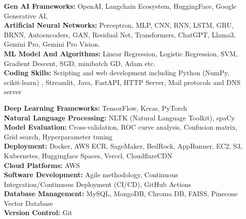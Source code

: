 \documentclass[letterpaper,11pt]{article}
\begin{document}
\begin{itemize}[leftmargin=0.15in, label={}]
    \small{
    \item{
        
        \textbf{Gen AI Frameworks:} OpenAI, Langchain Ecosystem, HuggingFace, Google Generative AI, \\
        \vspace{0.15cm}
        \textbf{Artificial Neural Networks:} Perceptron, MLP, CNN, RNN, LSTM, GRU, BRNN, Autoencoders, GAN, Residual Net, Transformers, ChatGPT, Llama3, Gemini Pro, Gemini Pro Vision.  \\
        \vspace{0.15cm}
        \textbf{ML Model And Algorithms:} Linear Regression, Logistic Regression, SVM, Gradient Descent, SGD, minibatch GD, Adam etc. \\
        \vspace{0.15cm}
        \textbf{Coding Skills:} Scripting and web development including Python (NumPy, scikit-learn) , Streamlit, Java, FastAPI, HTTP Server, Mail protocols and DNS server \\
        \vspace{0.15cm}

        \textbf{Deep Learning Frameworks:} TensorFlow, Keras, PyTorch \\
        \vspace{0.15cm}
        \textbf{Natural Language Processing:} NLTK (Natural Language Toolkit), spaCy \\
        \vspace{0.15cm}
        \textbf{Model Evaluation:} Cross-validation, ROC curve analysis, Confusion matrix, Grid search, Hyperparameter tuning \\
        \vspace{0.15cm}
        \textbf{Deployment:} Docker, AWS ECR, SageMaker, BedRock, AppRunner, EC2, S3, Kubernetes, Huggingface Spaces, Vercel, CloudflareCDN \\
        \vspace{0.15cm}
        \textbf{Cloud Platforms:} AWS  \\
        \vspace{0.15cm}
        \textbf{Software Development:} Agile methodology, Continuous Integration/Continuous Deployment (CI/CD), GitHub Actions \\
        \vspace{0.15cm}
        \textbf{Database Management:} MySQL, MongoDB, Chroma DB, FAISS, Pinecone Vector Database \\
        \vspace{0.15cm}
        \textbf{Version Control:} Git \\
        \vspace{0.15cm}
    }
    }
\end{itemize}
\end{document}
